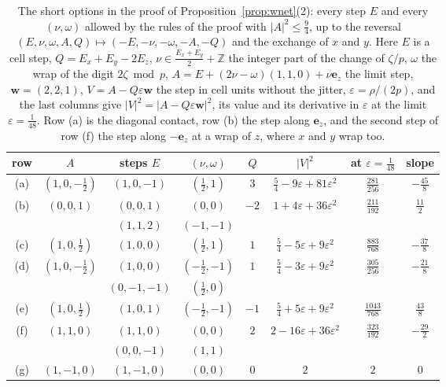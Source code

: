 \documentclass[11pt]{amsart}
\theoremstyle{definition}
\theoremstyle{plain}
\newcommand{\Z}{\mathbb{Z}}
\newcommand{\e}{\mathbf{e}}
\begin{document}
\begin{table}[tbp]
\centering\footnotesize\setlength{\tabcolsep}{4pt}\renewcommand{\arraystretch}{1.3}
\begin{tabular}{@{}cccccccc@{}}
\toprule
row & $A$ & steps $E$ & $(\nu,\omega)$ & $Q$ & $|V|^2$ & at $\varepsilon=\frac1{48}$ & slope\\
\midrule
(a) & $(1,0,-\frac12)$ & $(1,0,-1)$ & $(\frac12,1)$ & $3$ & $\frac{5}{4}-9\varepsilon+81\varepsilon^2$ & $\frac{281}{256}$ & $-\frac{45}{8}$\\
(b) & $(0,0,1)$ & $(0,0,1)$ & $(0,0)$ & $-2$ & $1+4\varepsilon+36\varepsilon^2$ & $\frac{211}{192}$ & $\frac{11}{2}$\\
 & & $(1,1,2)$ & $(-1,-1)$ & & & & \\
(c) & $(1,0,\frac12)$ & $(1,0,0)$ & $(\frac12,1)$ & $1$ & $\frac{5}{4}-5\varepsilon+9\varepsilon^2$ & $\frac{883}{768}$ & $-\frac{37}{8}$\\
(d) & $(1,0,-\frac12)$ & $(1,0,0)$ & $(-\frac12,-1)$ & $1$ & $\frac{5}{4}-3\varepsilon+9\varepsilon^2$ & $\frac{305}{256}$ & $-\frac{21}{8}$\\
 & & $(0,-1,-1)$ & $(\frac12,0)$ & & & & \\
(e) & $(1,0,\frac12)$ & $(1,0,1)$ & $(-\frac12,-1)$ & $-1$ & $\frac{5}{4}+5\varepsilon+9\varepsilon^2$ & $\frac{1043}{768}$ & $\frac{43}{8}$\\
(f) & $(1,1,0)$ & $(1,1,0)$ & $(0,0)$ & $2$ & $2-16\varepsilon+36\varepsilon^2$ & $\frac{323}{192}$ & $-\frac{29}{2}$\\
 & & $(0,0,-1)$ & $(1,1)$ & & & & \\
(g) & $(1,-1,0)$ & $(1,-1,0)$ & $(0,0)$ & $0$ & $2$ & $2$ & $0$\\
\bottomrule
\end{tabular}
\medskip
\caption{The short options in the proof of Proposition~\ref{prop:wnet}(2): every step $E$ and every $(\nu,\omega)$ allowed by the rules of the proof with $|A|^2\le\frac94$, up to the reversal $(E,\nu,\omega,A,Q)\mapsto(-E,-\nu,-\omega,-A,-Q)$ and the exchange of $x$ and $y$. Here $E$ is a cell step, $Q=E_x+E_y-2E_z$, $\nu\in\frac{E_x+E_y}2+\Z$ the integer part of the change of $\zeta/p$, $\omega$ the wrap of the digit $2\zeta\bmod p$, $A=E+(2\nu-\omega)(1,1,0)+\nu\e_z$ the limit step, $\mathbf w=(2,2,1)$, $V=A-Q\varepsilon\mathbf w$ the step in cell units without the jitter, $\varepsilon=\rho/(2p)$, and the last columns give $|V|^2=|A-Q\varepsilon\mathbf w|^2$, its value and its derivative in $\varepsilon$ at the limit $\varepsilon=\frac1{48}$. Row (a) is the diagonal contact, row (b) the step along $\e_z$, and the second step of row (f) the step along $-\e_z$ at a wrap of $z$, where $x$ and $y$ wrap too.}
\label{tab:wcontacts}
\end{table}
\end{document}
